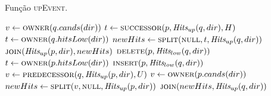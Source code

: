 \begin{algorithm}[H]
    \caption{Função \textsc{upEvent}.}
    \label{alg:par-cinetico:eventoup}
    \begin{algorithmic}[1]
                \State $v \leftarrow \Call{owner}{q.cands(dir)}$
                    \State {}
                \EndIf
                \State {}
                \State $t \leftarrow \Call{successor}{p, \Hits_{up}(q, dir), H}$
                    \State $t \leftarrow \Call{owner}{q.hitsLow(dir)}$
                \EndIf
                \State $newHits \leftarrow \Call{split}{\nnull, t, \Hits_{up}(q, dir)}$
                \State $\Call{join}{\Hits_{up}(p, dir), newHits}$
                \State $\Call{delete}{p, \Hits_{low}(q, dir)}$
                    \State {}
                \EndIf
            \Else
                    \State $t \leftarrow \Call{owner}{p.hitsLow(dir)}$
                        \State {}
                    \EndIf
                    \State $\Call{insert}{p, \Hits_{low}(q, dir)}$
                    \State $v \leftarrow \Call{predecessor}{q, \Hits_{up}(p, dir), U}$
                        \State $v \leftarrow \Call{owner}{p.cands(dir)}$
                    \EndIf
                    \State $newHits \leftarrow \Call{split}{v, \nnull, \Hits_{up}(p,dir)}$
                    \State $\Call{join}{newHits, \Hits_{up}(q, dir)}$
                    \State {}
                        \State {}
                    \EndIf
                \EndIf
            \EndIf
        \EndFunction
    \end{algorithmic}
\end{algorithm}